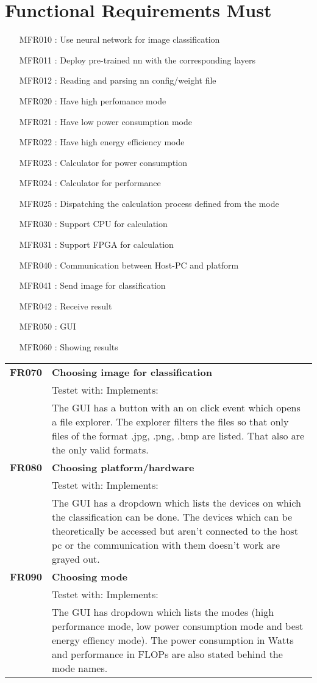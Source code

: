 \documentclass[parskip=full]{scrartcl}
\begin{document}
\section{Functional Requirements Must}
\begin{itemize}[nosep]
\item [MFR010]: Use neural network for image classification
\item [MFR011]: Deploy pre-trained nn with the corresponding layers
\item [MFR012]: Reading and parsing nn config/weight file
\item [MFR020]: Have high perfomance mode
\item [MFR021]: Have low power consumption mode
\item [MFR022]: Have high energy efficiency mode
\item [MFR023]: Calculator for power consumption
\item [MFR024]: Calculator for performance
\item [MFR025]: Dispatching the calculation process defined from the mode
\item [MFR030]: Support CPU for calculation
\item [MFR031]: Support FPGA for calculation
\item [MFR040]: Communication between Host-PC and platform
\item [MFR041]: Send image for classification
\item [MFR042]: Receive result
\item [MFR050]: GUI
\item [MFR060]: Showing results
\end{itemize}
\begin{tabular}{p{2cm}p{12cm}}
\textbf{FR070} & \textbf{Choosing image for classification}\\
& Testet with: Implements: \\
& The GUI has a button with an on click event which opens a file explorer. The explorer filters the files so that only files of the format .jpg, .png, .bmp are listed. That also are the only valid formats.\\
\textbf{FR080} & \textbf{Choosing platform/hardware}\\
& Testet with: Implements: \\
& The GUI has a dropdown which lists the devices on which the classification can be done. The devices which can be theoretically be accessed but aren't connected to the host pc or the communication with them doesn't work are grayed out. \\
\textbf{FR090} & \textbf{Choosing mode}\\
& Testet with: Implements: \\
& The GUI has dropdown which lists the modes (high performance mode, low power consumption mode and best energy effiency mode). The power consumption in Watts and performance in FLOPs are also stated behind the mode names.
\end{tabular}
\end{document}
